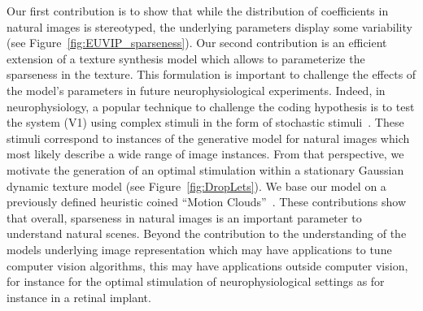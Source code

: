 \documentclass{article}
\begin{document}
Our first contribution is to show that while the distribution of coefficients in natural images is stereotyped, the underlying parameters display some variability (see Figure~\ref{fig:EUVIP_sparseness}). Our second contribution is an efficient extension of a texture synthesis model which allows to parameterize the sparseness in the texture. This formulation is important to challenge the effects of the model's parameters in future neurophysiological experiments. Indeed, in neurophysiology, a popular technique to challenge the coding hypothesis is to test the system (V1) using complex stimuli in the form of stochastic stimuli~\citep{Touryan01}. These stimuli correspond to instances of the generative model for natural images which most likely describe a wide range of image instances. From that perspective, we motivate the generation of an optimal stimulation within a stationary Gaussian dynamic texture model (see Figure~\ref{fig:DropLets}). We base our model on a previously defined heuristic coined ``Motion Clouds''~\citep{Leon12}. These contributions show that overall, sparseness in natural images is an important parameter to understand natural scenes. Beyond the contribution to the understanding of the models underlying image representation which may have applications to tune computer vision algorithms, this may have applications outside computer vision, for instance for the optimal stimulation of neurophysiological settings as for instance in a retinal implant.
\end{document}
